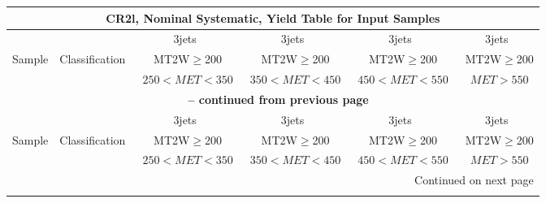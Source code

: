 \documentclass{article}
\begin{document}
 
 
 
 
\pagebreak 

 
 
 
 
\begin{longtable}{|l|c|c|c|c|c|} 
 
\multicolumn{6}{c}{ CR2l, Nominal Systematic, Yield Table for Input Samples }\\* \hline 
 &  & 3jets  & 3jets  & 3jets  & 3jets \\* 
Sample & Classification  & ~MT2W$\ge$200  & ~MT2W$\ge$200  & ~MT2W$\ge$200  & ~MT2W$\ge$200 \\* 
 &  & ~$250<MET<350$  & ~$350<MET<450$  & ~$450<MET<550$  & ~$MET>550$ \\* 
\hline \hline 
\endfirsthead 
 
\multicolumn{6}{c}{{\bfseries \tablename\ \thetable{} -- continued from previous page}}\\* \hline 
 &  & 3jets  & 3jets  & 3jets  & 3jets \\* 
Sample & Classification  & ~MT2W$\ge$200  & ~MT2W$\ge$200  & ~MT2W$\ge$200  & ~MT2W$\ge$200 \\* 
 &  & ~$250<MET<350$  & ~$350<MET<450$  & ~$450<MET<550$  & ~$MET>550$ \\* 
\hline \hline 
\endhead 
 
\multicolumn{6}{|r|}{{Continued on next page}}\\* \hline 
\endfoot 
 
 
\endlastfoot 
 

\end{longtable}
\end{document}
